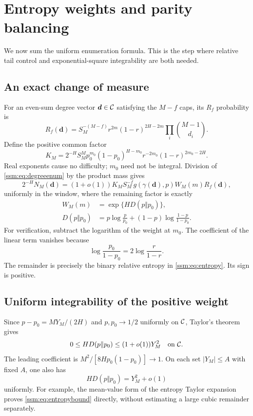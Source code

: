 \section{Entropy weights and parity balancing}\label{ssm:sec:transferproof}
We now sum the uniform enumeration formula. This is the step where relative tail control and exponential-square integrability are both needed.

\subsection{An exact change of measure}
For an even-sum degree vector $\boldsymbol d\in\mathcal C$ satisfying the $M-f$ caps, its $R_f$ probability is
\[
 R_f(\boldsymbol d)=S_M^{-(M-f)}r^{2m}(1-r)^{2H-2m}
 \prod_i\binom{M-1}{d_i}.
\]
Define the positive common factor
\begin{equation}\label{ssm:eq:K}
 K_M=2^{-H}S_M^M p_0^{m_0}(1-p_0)^{H-m_0}
 r^{-2m_0}(1-r)^{2m_0-2H}.
\end{equation}
Real exponents cause no difficulty; $m_0$ need not be integral. Division of \eqref{ssm:eq:degreeenum} by the product mass gives
\begin{equation}\label{ssm:eq:pointtransfer}
 2^{-H}N_M(\boldsymbol d)
 =(1+o(1))K_MS_M^{-f}g(\gamma(\boldsymbol d),p)W_M(m)R_f(\boldsymbol d),
\end{equation}
uniformly in the window, where the remaining factor is exactly
\begin{equation}\label{ssm:eq:entropy}
 \begin{split}
 W_M(m)&=\exp\{H D(p\Vert p_0)\},\\
 D(p\Vert p_0)&=p\log\frac p{p_0}+(1-p)\log\frac{1-p}{1-p_0}.
 \end{split}
\end{equation}
For verification, subtract the logarithm of the weight at $m_0$. The coefficient of the linear term vanishes because
\[
 \log\frac{p_0}{1-p_0}=2\log\frac r{1-r}.
\]
The remainder is precisely the binary relative entropy in \eqref{ssm:eq:entropy}. Its sign is positive.

\subsection{Uniform integrability of the positive weight}
Since $p-p_0=MY_M/(2H)$ and $p,p_0\to1/2$ uniformly on $\mathcal C$, Taylor's theorem gives
\begin{equation}\label{ssm:eq:entropybound}
 0\le HD(p\Vert p_0)\le(1+o(1))Y_M^2\quad\text{on }\mathcal C.
\end{equation}
The leading coefficient is $M^2/[8Hp_0(1-p_0)]\to1$. On each set $|Y_M|\le A$ with fixed $A$, one also has
\begin{equation}\label{ssm:eq:entropycompact}
 HD(p\Vert p_0)=Y_M^2+o(1)
\end{equation}
uniformly. For example, the mean-value form of the entropy Taylor expansion proves \eqref{ssm:eq:entropybound} directly, without estimating a large cubic remainder separately.

